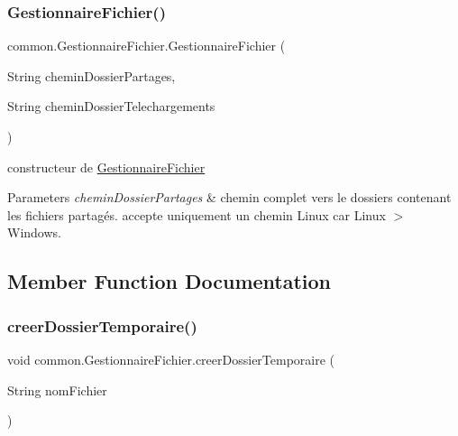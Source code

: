 \subsubsection{\texorpdfstring{Gestionnaire\+Fichier()}{GestionnaireFichier()}}
{\footnotesize\ttfamily common.\+Gestionnaire\+Fichier.\+Gestionnaire\+Fichier (\begin{DoxyParamCaption}\item[{String}]{chemin\+Dossier\+Partages,  }\item[{String}]{chemin\+Dossier\+Telechargements }\end{DoxyParamCaption})\hspace{0.3cm}{\ttfamily [inline]}}



constructeur de \hyperlink{classcommon_1_1GestionnaireFichier}{Gestionnaire\+Fichier} 


\begin{DoxyParams}{Parameters}
{\em chemin\+Dossier\+Partages} & chemin complet vers le dossiers contenant les fichiers partagés. accepte uniquement un chemin Linux car Linux $>$ Windows. \\
\hline
\end{DoxyParams}


\subsection{Member Function Documentation}
\mbox{\label{classcommon_1_1GestionnaireFichier_aa32c12e7c7269b4142b4f93dc89603b7}} 
\subsubsection{\texorpdfstring{creer\+Dossier\+Temporaire()}{creerDossierTemporaire()}}
{\footnotesize\ttfamily void common.\+Gestionnaire\+Fichier.\+creer\+Dossier\+Temporaire (\begin{DoxyParamCaption}\item[{String}]{nom\+Fichier }\end{DoxyParamCaption})\hspace{0.3cm}{\ttfamily [inline]}}



